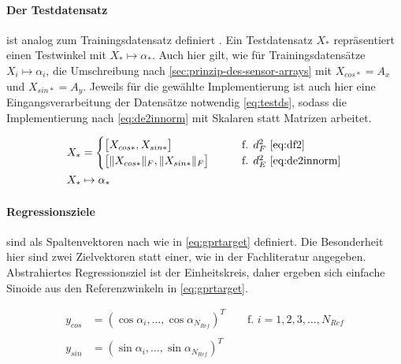 \paragraph*{Der Testdatensatz} ist analog zum Trainingsdatensatz definiert \cite{Rasmussen2006}. Ein Testdatensatz $X_*$ repräsentiert einen Testwinkel mit $X_* \mapsto \alpha_*$. Auch hier gilt, wie für Trainingsdatensätze $X_i \mapsto \alpha_i$, die Umschreibung nach \autoref{sec:prinzip-des-sensor-arrays} mit $X_{cos*} = A_x$ und $X_{sin*} = A_y$. Jeweils für die gewählte Implementierung ist auch hier eine Eingangsverarbeitung der Datensätze notwendig \autoref{eq:testds}, sodass die Implementierung nach \autoref{eq:de2innorm} mit Skalaren statt Matrizen arbeitet. 


\begin{align}\label{eq:testds}
	X_* &= 
	\begin{cases}
		\big[ X_{cos*}, X_{sin*} \big]             &\qquad \text{f. } d_F^2 \text{ \eqref{eq:df2}} \\
		\big[ \|X_{cos*}\|_F, \|X_{sin*}\|_F \big] &\qquad \text{f. } d_E^2 \text{ \eqref{eq:de2innorm}}
	\end{cases} \\
	X_* & \mapsto \alpha_* \nonumber
\end{align}


\clearpage


\paragraph*{Regressionsziele} sind als Spaltenvektoren nach \cite{Rasmussen2006} wie in \autoref{eq:gprtarget} definiert. Die Besonderheit hier sind zwei Zielvektoren statt einer, wie in der Fachliteratur \cite{Rasmussen2006} angegeben. Abstrahiertes Regressionsziel ist der Einheitskreis, daher ergeben sich einfache Sinoide aus den Referenzwinkeln in \autoref{eq:gprtarget}.


\begin{align}\label{eq:gprtarget}
	y_{cos} &= (\cos \alpha_i, \ldots, \cos \alpha_{N_{Ref}})^T \qquad \text{f. } i = 1,2,3,\ldots,N_{Ref} \nonumber \\
	\\
	y_{sin} &= (\sin \alpha_i, \ldots, \sin \alpha_{N_{Ref}})^T \nonumber
\end{align}


